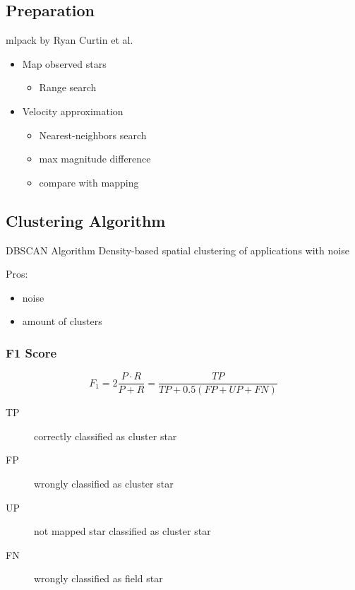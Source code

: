 \documentclass{beamer}
\begin{document}
\subsection{Preparation}
\begin{frame}

mlpack by Ryan Curtin et al.
\\[2ex]
\begin{itemize}
\item Map observed stars 
	\begin{itemize}
	\item Range search
	\end{itemize}
\item Velocity approximation
	\begin{itemize}
	\item Nearest-neighbors search
	\item max magnitude difference
	\item compare with mapping
	\end{itemize}
\end{itemize}

\end{frame}

\subsection{Clustering Algorithm}

\begin{frame}

\begin{block}{DBSCAN Algorithm}
Density-based spatial clustering of applications with noise
\end{block}

Pros:
\begin{itemize}
\item noise
\item amount of clusters
\end{itemize}

\end{frame}


\begin{frame}
\frametitle{F1 Score}
\begin{equation*}
F_1 = 2 \frac{P \cdot R}{P+R} = \frac{TP}{TP+0.5(FP+UP+FN)}
\end{equation*}
\vspace{\baselineskip}
\begin{description}
\item[TP] correctly classified as cluster star
\item[FP] wrongly classified as cluster star
\item[UP] not mapped star classified as cluster star
\item[FN] wrongly classified as field star
\end{description}


\end{frame}
\end{document}

